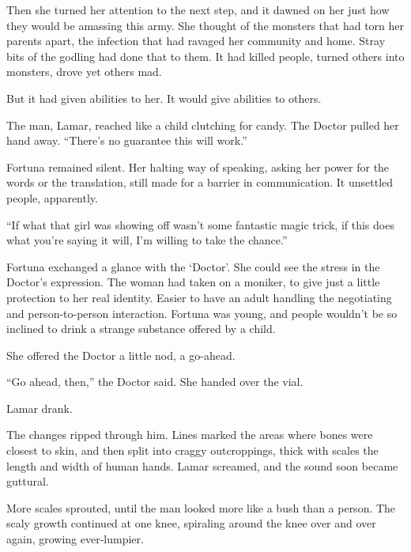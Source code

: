 Then she turned her attention to the next step, and it dawned on her just how they would be amassing this army.  She thought of the monsters that had torn her parents apart, the infection that had ravaged her community and home.  Stray bits of the godling had done that to them.  It had killed people, turned others into monsters, drove yet others mad.



But it had given abilities to her.  It would give abilities to others.



\blacksquare



The man, Lamar, reached like a child clutching for candy.  The Doctor pulled her hand away.  ``There's no guarantee this will work.''



Fortuna remained silent.  Her halting way of speaking, asking her power for the words or the translation, still made for a barrier in communication.  It unsettled people, apparently.



``If what that girl was showing off wasn't some fantastic magic trick, if this does what you're saying it will, I'm willing to take the chance.''



Fortuna exchanged a glance with the `Doctor'.  She could see the stress in the Doctor's expression.  The woman had taken on a moniker, to give just a little protection to her real identity.  Easier to have an adult handling the negotiating and person-to-person interaction.  Fortuna was young, and people wouldn't be so inclined to drink a strange substance offered by a child.



She offered the Doctor a little nod, a go-ahead.



``Go ahead, then,'' the Doctor said.  She handed over the vial.



Lamar drank.



The changes ripped through him.  Lines marked the areas where bones were closest to skin, and then split into craggy outcroppings, thick with scales the length and width of human hands.  Lamar screamed, and the sound soon became guttural.



More scales sprouted, until the man looked more like a bush than a person.  The scaly growth continued at one knee, spiraling around the knee over and over again, growing ever-lumpier.



